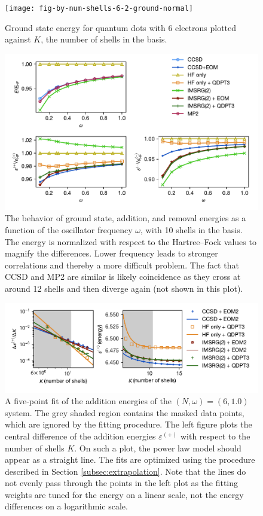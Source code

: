 \begin{figure}
  \centering
  \texttt{[image: fig-by-num-shells-6-2-ground-normal]}
  \caption{Ground state energy for quantum dots with 6 electrons plotted against $K$, the number of shells in the basis.}
  \label{fig:by-num-shells-6-2-ground-0-normal}
\end{figure}

\begin{figure}
  \centering
  \includegraphics{fig-by-freq-10-6-normal}
  \caption{The behavior of ground state, addition, and removal energies as a function of the oscillator frequency $\omega$, with 10 shells in the basis.  The energy is normalized with respect to the Hartree--Fock values to magnify the differences.  Lower frequency leads to stronger correlations and thereby a more difficult problem.  The fact that CCSD and MP2 are similar is likely coincidence as they cross at around 12 shells and then diverge again (not shown in this plot).}
  \label{fig:by-freq-10-6-normal}
\end{figure}

\begin{figure}
  \centering
  \includegraphics{fig-fit-2-1p0-add}
  \caption{A five-point fit of the addition energies of the $(N, \omega) = (6, 1.0)$ system.  The grey shaded region contains the masked data points, which are ignored by the fitting procedure.  The left figure plots the central difference of the addition energies $\varepsilon^{(+)}$ with respect to the number of shells $K$.  On such a plot, the power law model should appear as a straight line.  The fits are optimized using the procedure described in Section \ref{subsec:extrapolation}.  Note that the lines do not evenly pass through the points in the left plot as the fitting weights are tuned for the energy on a linear scale, not the energy differences on a logarithmic scale.}
  \label{fig:by-fit-2-1p0-add}
\end{figure}

